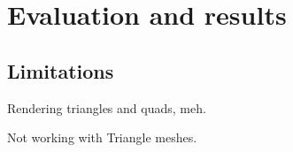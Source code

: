 \chapter{Evaluation and results}
\label{chap:results}

\section{Limitations}

Rendering triangles and quads, meh.

Not working with Triangle meshes.


